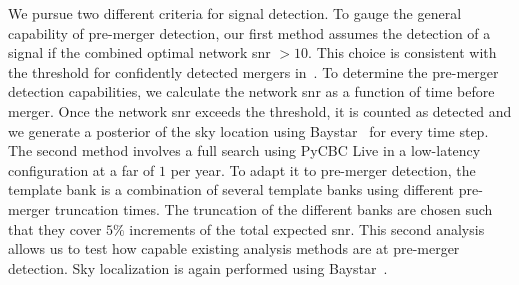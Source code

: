 We pursue two different criteria for signal detection. To gauge the general capability of pre-merger detection, our first method assumes the detection of a signal if the combined optimal network \acrshort{snr} $> 10$. This choice is consistent with the threshold for confidently detected mergers in~\cite{LIGOScientific:2018mvr, Nitz:2020oeq}. To determine the pre-merger detection capabilities, we calculate the network \acrshort{snr} as a function of time before merger. Once the network \acrshort{snr} exceeds the threshold, it is counted as detected and we generate a posterior of the sky location using Baystar~\cite{Singer:2015ema} for every time step. The second method involves a full search using PyCBC Live in a low-latency configuration at a \acrshort{far} of $1$ per year. To adapt it to pre-merger detection, the template bank is a combination of several template banks using different pre-merger truncation times. The truncation of the different banks are chosen such that they cover $5\%$ increments of the total expected \acrshort{snr}. This second analysis allows us to test how capable existing analysis methods are at pre-merger detection. Sky localization is again performed using Baystar~\cite{Singer:2015ema}.

